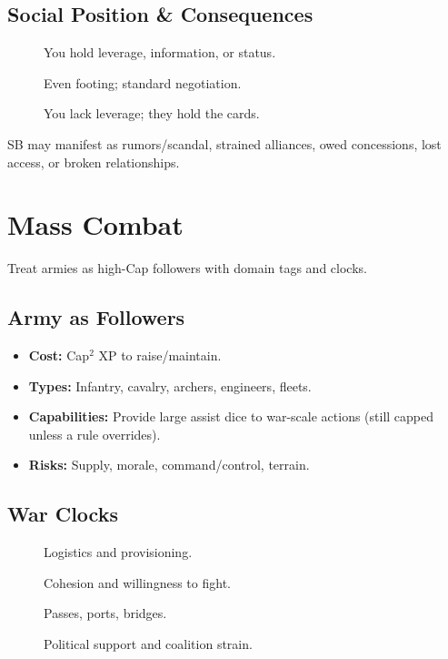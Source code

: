 \subsection{Social Position \& Consequences}
\label{subsec:social-position}
\begin{description}
  \item[] You hold leverage, information, or status.
  \item[] Even footing; standard negotiation.
  \item[] You lack leverage; they hold the cards.
\end{description}
\noindent SB may manifest as rumors/scandal, strained alliances, owed concessions, lost access, or broken relationships.

\section{Mass Combat}
\label{sec:mass-combat}
Treat armies as high-Cap followers with domain tags and clocks.
\subsection{Army as Followers}
\label{subsec:army-followers}
\begin{itemize}
  \item \textbf{Cost:} Cap$^2$ XP to raise/maintain. 
  \item \textbf{Types:} Infantry, cavalry, archers, engineers, fleets.
  \item \textbf{Capabilities:} Provide large assist dice to war-scale actions (still capped unless a rule overrides). 
  \item \textbf{Risks:} Supply, morale, command/control, terrain.
\end{itemize}
\subsection{War Clocks}
\label{subsec:war-clocks}
\begin{description}
  \item[] Logistics and provisioning.
  \item[] Cohesion and willingness to fight.
  \item[] Passes, ports, bridges.
  \item[] Political support and coalition strain.
\end{description}


